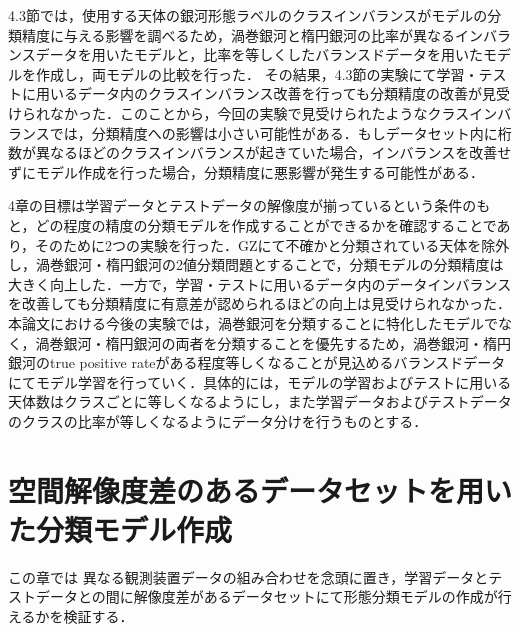 \documentclass[a4j, 11pt]{jreport}
\begin{document}
4.3節では，使用する天体の銀河形態ラベルのクラスインバランスがモデルの分類精度に与える影響を調べるため，渦巻銀河と楕円銀河の比率が異なるインバランスデータを用いたモデルと，比率を等しくしたバランスドデータを用いたモデルを作成し，両モデルの比較を行った．
その結果，4.3節の実験にて学習・テストに用いるデータ内のクラスインバランス改善を行っても分類精度の改善が見受けられなかった．このことから，今回の実験で見受けられたようなクラスインバランスでは，分類精度への影響は小さい可能性がある．もしデータセット内に桁数が異なるほどのクラスインバランスが起きていた場合，インバランスを改善せずにモデル作成を行った場合，分類精度に悪影響が発生する可能性がある．

4章の目標は学習データとテストデータの解像度が揃っているという条件のもと，どの程度の精度の分類モデルを作成することができるかを確認することであり，そのために2つの実験を行った．GZにて不確かと分類されている天体を除外し，渦巻銀河・楕円銀河の2値分類問題とすることで，分類モデルの分類精度は大きく向上した．一方で，学習・テストに用いるデータ内のデータインバランスを改善しても分類精度に有意差が認められるほどの向上は見受けられなかった．本論文における今後の実験では，渦巻銀河を分類することに特化したモデルでなく，渦巻銀河・楕円銀河の両者を分類することを優先するため，渦巻銀河・楕円銀河のtrue positive rateがある程度等しくなることが見込めるバランスドデータにてモデル学習を行っていく．具体的には，モデルの学習およびテストに用いる天体数はクラスごとに等しくなるようにし，また学習データおよびテストデータのクラスの比率が等しくなるようにデータ分けを行うものとする．



\newpage
\chapter{空間解像度差のあるデータセットを用いた分類モデル作成}

この章では
異なる観測装置データの組み合わせを念頭に置き，学習データとテストデータとの間に解像度差があるデータセットにて形態分類モデルの作成が行えるかを検証する．
\end{document}
